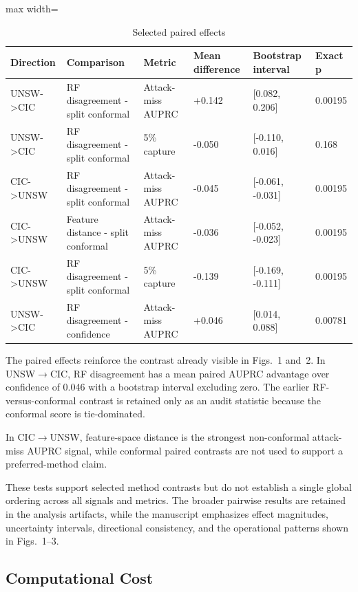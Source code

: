 \documentclass[conference]{IEEEtran}
\begin{document}
\begin{table}[t]
\centering
\caption{Selected paired effects}
\begin{adjustbox}{max width=\columnwidth}
\begin{tabular}{llllll}
\toprule
\textbf{Direction} & \textbf{Comparison} & \textbf{Metric} & \textbf{Mean difference} & \textbf{Bootstrap interval} & \textbf{Exact p} \\
\midrule
UNSW->CIC & RF disagreement - split conformal & Attack-miss AUPRC & +0.142 & [0.082, 0.206] & 0.00195 \\
UNSW->CIC & RF disagreement - split conformal & 5\% capture & -0.050 & [-0.110, 0.016] & 0.168 \\
CIC->UNSW & RF disagreement - split conformal & Attack-miss AUPRC & -0.045 & [-0.061, -0.031] & 0.00195 \\
CIC->UNSW & Feature distance - split conformal & Attack-miss AUPRC & -0.036 & [-0.052, -0.023] & 0.00195 \\
CIC->UNSW & RF disagreement - split conformal & 5\% capture & -0.139 & [-0.169, -0.111] & 0.00195 \\
UNSW->CIC & RF disagreement - confidence & Attack-miss AUPRC & +0.046 & [0.014, 0.088] & 0.00781 \\
\bottomrule
\end{tabular}
\end{adjustbox}
\end{table}

The paired effects reinforce the contrast already visible in Figs.~1 and~2. In UNSW$\rightarrow$CIC, RF disagreement has a mean paired AUPRC advantage over confidence of 0.046 with a bootstrap interval excluding zero. The earlier RF-versus-conformal contrast is retained only as an audit statistic because the conformal score is tie-dominated.

In CIC$\rightarrow$UNSW, feature-space distance is the strongest non-conformal attack-miss AUPRC signal, while conformal paired contrasts are not used to support a preferred-method claim.

These tests support selected method contrasts but do not establish a single global ordering across all signals and metrics. The broader pairwise results are retained in the analysis artifacts, while the manuscript emphasizes effect magnitudes, uncertainty intervals, directional consistency, and the operational patterns shown in Figs.~1--3.

\subsection{Computational Cost}
\end{document}

